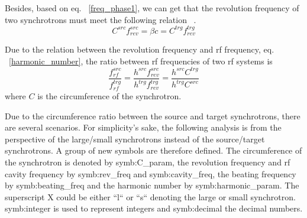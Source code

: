Besides, based on eq. ~\ref{freq_phase1}, we can get that the revolution frequency of two synchrotrons must meet the following relation ~\cite{garoby_timing_1984}.
\begin{equation}
	C^{\mathit{src}}f_{rev}^{\mathit{src}} = \beta c=C^{\mathit{trg}}f_{rev}^{\mathit{trg}}
\end{equation}

Due to the relation between the revolution frequency and rf frequency, eq. ~\ref{harmonic_number}, the ratio between rf frequencies of two rf systems is
\begin{equation}
	\frac{f_{rf}^{\mathit{src}}}{f_{rf}^{\mathit{trg}}}=\frac{h^{\mathit{src}}f_{rev}^{\mathit{src}}}{h^{\mathit{trg}}f_{rev}^{\mathit{trg}}}=\frac{h^{\mathit{src}}C^{\mathit{trg}}}{h^{\mathit{trg}}C^{\mathit{src}}}
\end{equation}
where $C$ is the circumference of the synchrotron. 

Due to the circumference ratio between the source and target synchrotrons, there are several scenarios. For simplicity's sake, the following analysis is from the perspective of the large/small synchrotrons instead of the source/target synchrotrons. A group of new symbols are therefore defined. The circumference of the synchrotron is denoted by \gls{symb:C_param}, the revolution frequency and rf cavity frequency by \gls{symb:rev_freq} and \gls{symb:cavity_freq}, the beating frequency by \gls{symb:beating_freq} and the harmonic number by \gls{symb:harmonic_param}. The superscript X could be either ``l`` or ``s`` denoting the large or small synchrotron. \gls{symb:integer} is used to represent integers and \gls{symb:decimal} the decimal numbers.

